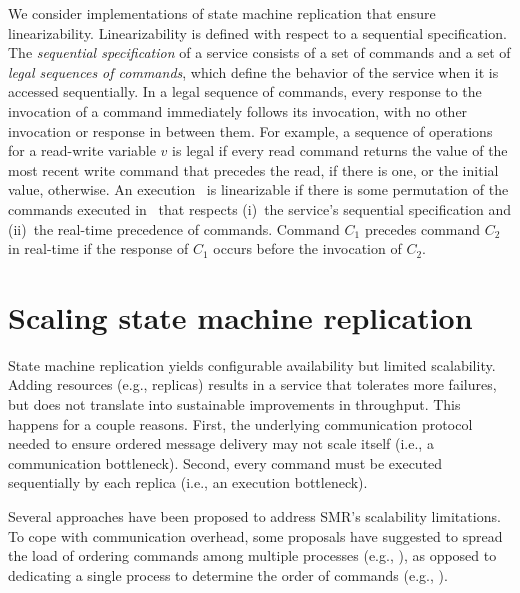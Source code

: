 We consider implementations of state machine replication that ensure
linearizability. Linearizability is defined with respect to a sequential
specification. The \emph{sequential specification} of a service consists of a
set of commands and a set of \emph{legal sequences of commands}, which define
the behavior of the service when it is accessed sequentially. In a legal
sequence of commands, every response to the invocation of a command immediately
follows its invocation, with no other invocation or response in between them.
For example, a sequence of operations for a read-write variable $v$ is legal if
every read command returns the value of the most recent write command that
precedes the read, if there is one, or the initial value, otherwise. An
execution \ex\ is linearizable if there is some permutation of the commands
executed in \ex\ that respects (i)~the service's sequential specification and
(ii)~the real-time precedence of commands. Command $C_1$ precedes command $C_2$
in real-time if the response of $C_1$ occurs before the invocation of $C_2$.


\section{Scaling state machine replication}

State machine replication yields configurable availability but limited
scalability. Adding resources (e.g., replicas) results in a service that
tolerates more failures, but does not translate into sustainable improvements in
throughput. This happens for a couple reasons. First, the underlying
communication protocol needed to ensure ordered message delivery may not scale
itself (i.e., a communication bottleneck). Second, every command must be
executed sequentially by each replica (i.e., an execution bottleneck).

Several approaches have been proposed to address SMR's scalability limitations.
To cope with communication overhead, some proposals have suggested to spread the
load of ordering commands among multiple processes (e.g.,
\cite{Moraru:2013gw,Mencius,Marandi:2012hb}), as opposed to dedicating a single
process to determine the order of commands (e.g.,
\cite{Lam98}).%

